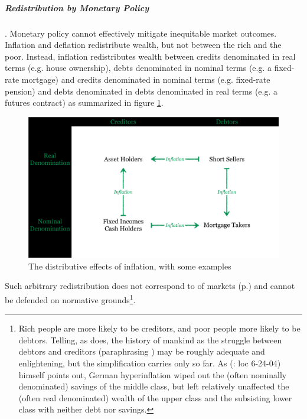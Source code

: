 \subparagraph{Redistribution by Monetary Policy}  \label{sec:distributive-effects-of-inflation}.  Monetary policy cannot effectively mitigate inequitable market outcomes. Inflation and deflation redistribute wealth, but not between the rich and the poor. Instead, inflation redistributes wealth between credits denominated in real terms (e.g. house ownership), debts denominated in nominal terms (e.g. a fixed-rate mortgage) and credits denominated in nominal terms (e.g. fixed-rate pension) and debts denominated in debts denominated in real terms (e.g. a futures contract) as summarized in figure \ref{fig:distributive-effects-of-inflation}. 

\begin{figure}[htbp]
	\centering
	\includegraphics[width=1\textwidth]{./img/distributive-effects-of-inflation}  
	\caption[Distributive Effects of Inflation]{The distributive effects of inflation, with some examples}
	\label{fig:distributive-effects-of-inflation}
\end{figure}

Such arbitrary redistribution does not correspond to  of markets  (p.\pageref{sec:inequalitydynamics}) and cannot be defended on normative grounds\footnote{
	Rich people are more likely to be creditors, and poor people more likely to be debtors. Telling, as \cite{Coggan2011} does, the history of mankind as the struggle between debtors and creditors (paraphrasing \citealt{Marx-1867-aa}) may be roughly adequate and enlightening, but the simplification carries only so far. As \citeauthor{Coggan2011}(\citeyear{Coggan2011}: loc 6-24-04) himself points out, German hyperinflation wiped out the (often nominally denominated) savings of the middle class, but left relatively unaffected the (often real denominated) wealth of the upper class and the subsisting lower class with neither debt nor savings.}. 
	
